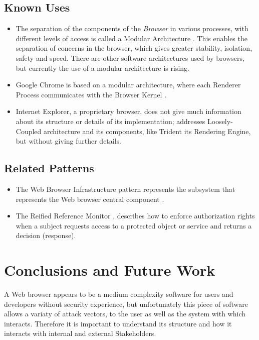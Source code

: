 \documentclass[prodmode,acmtecs]{acmsmall}
\begin{document}
  \subsection*{Known Uses}
  \begin{itemize}
    \item The separation of the components of the \textit{Browser} in various processes, with different levels of access is called a Modular Architecture \cite{Vrbanec2013}. This enables the separation of concerns in the browser, which gives greater stability, isolation, safety and speed. There are other software architectures used by browsers, but currently the use of a modular architecture is rising.
    \item Google Chrome is based on a modular architecture, where each Renderer Process communicates with the Browser Kernel \cite{multiProcGC}. 
    \item Internet Explorer, a proprietary browser, does not give much information about its structure or details of its implementation; \cite{Crowley2010} addresses Loosely-Coupled architecture \cite{IE8-LCIE} and its components, like Trident its Rendering Engine, but without giving further details. 
  \end{itemize}

  \subsection*{Related Patterns}
  \begin{itemize}
    \item The Web Browser Infrastructure pattern represents the subsystem that represents the Web browser central component \cite{silva2015}. 
    \item The Reified Reference Monitor \cite{fernandez2013security}, describes how to enforce authorization rights when a subject requests access to a protected object or service and returns a decision (response). 
  \end{itemize}

\section{Conclusions and Future Work}
A Web browser appears to be a medium complexity software for users and developers without security experience, but unfortunately this piece of software allows a variaty of attack vectors, to the user as well as the system with which interacts. Therefore it is important to understand its structure and how it interacts with internal and external Stakeholders.
\end{document}
